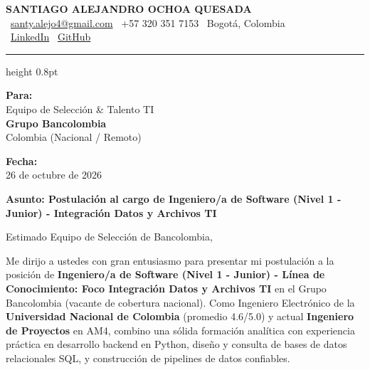 \documentclass[11pt,a4paper]{article}
\begin{document}
\thispagestyle{empty}
\color{darktext}

\begin{center}
    {\Huge \bfseries\color{accent} SANTIAGO ALEJANDRO OCHOA QUESADA} \\[6pt]
    {\small\color{darktext}
    \faEnvelope\ \href{mailto:santy.alejo4@gmail.com}{santy.alejo4@gmail.com}
    \quad\textcolor{bulletline}{\textbar}\quad
    \faPhone\ +57 320 351 7153
    \quad\textcolor{bulletline}{\textbar}\quad
    \faMapMarker*\ Bogotá, Colombia \\[4pt]
    \faLinkedin\ \href{https://linkedin.com/in/santiago-alejandro-ochoa-quesada-a07a18288/}{LinkedIn}
    \quad\textcolor{bulletline}{\textbar}\quad
    \faGithub\ \href{https://github.com/Sochoaq}{GitHub}
    }
\end{center}
\vspace{2pt}
{\color{bulletline}\hrule height 0.8pt}
\vspace{10pt}

\noindent
\begin{minipage}[t]{0.62\textwidth}
    \textbf{\color{accent} Para:}\\
    Equipo de Selección \& Talento TI\\
    \textbf{Grupo Bancolombia}\\
    Colombia (Nacional / Remoto)
\end{minipage}
\hfill
\begin{minipage}[t]{0.35\textwidth}\raggedleft
    \textbf{\color{accent} Fecha:}\\
    26 de octubre de 2026
\end{minipage}

\vspace{6pt}
\noindent
{\large\bfseries\color{accent} Asunto: Postulación al cargo de Ingeniero/a de Software (Nivel 1 - Junior) - Integración Datos y Archivos TI}
\vspace{2pt}

\noindent Estimado Equipo de Selección de Bancolombia,

Me dirijo a ustedes con gran entusiasmo para presentar mi postulación a la posición de \textbf{Ingeniero/a de Software (Nivel 1 - Junior) - Línea de Conocimiento: Foco Integración Datos y Archivos TI} en el Grupo Bancolombia (vacante de cobertura nacional). Como Ingeniero Electrónico de la \textbf{Universidad Nacional de Colombia} (promedio 4.6/5.0) y actual \textbf{Ingeniero de Proyectos} en AM4, combino una sólida formación analítica con experiencia práctica en desarrollo backend en Python, diseño y consulta de bases de datos relacionales SQL, y construcción de pipelines de datos confiables.
\end{document}
